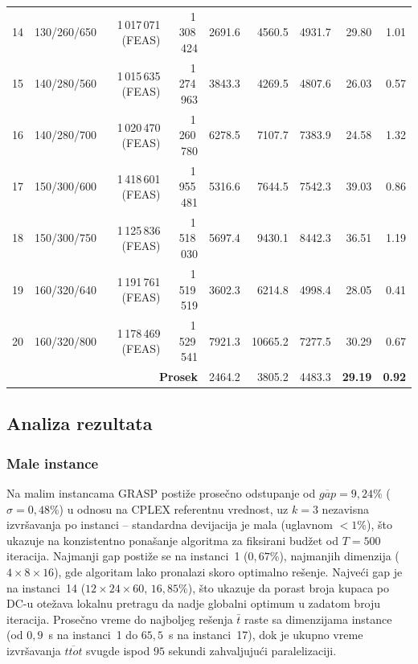 \documentclass[12pt,a4paper]{article}
\begin{document}
\begin{longtable}{r l r r r r r r r}
14 & 130/260/650 & 1\,017\,071 (FEAS) & 1\,308\,424 & 2691.6 & 4560.5 & 4931.7 & 29.80 & 1.01 \\
15 & 140/280/560 & 1\,015\,635 (FEAS) & 1\,274\,963 & 3843.3 & 4269.5 & 4807.6 & 26.03 & 0.57 \\
16 & 140/280/700 & 1\,020\,470 (FEAS) & 1\,260\,780 & 6278.5 & 7107.7 & 7383.9 & 24.58 & 1.32 \\
17 & 150/300/600 & 1\,418\,601 (FEAS) & 1\,955\,481 & 5316.6 & 7644.5 & 7542.3 & 39.03 & 0.86 \\
18 & 150/300/750 & 1\,125\,836 (FEAS) & 1\,518\,030 & 5697.4 & 9430.1 & 8442.3 & 36.51 & 1.19 \\
19 & 160/320/640 & 1\,191\,761 (FEAS) & 1\,519\,519 & 3602.3 & 6214.8 & 4998.4 & 28.05 & 0.41 \\
20 & 160/320/800 & 1\,178\,469 (FEAS) & 1\,529\,541 & 7921.3 & 10665.2 & 7277.5 & 30.29 & 0.67 \\
\midrule
\multicolumn{4}{r}{\textbf{Prosek}} & 2464.2 & 3805.2 & 4483.3 & \textbf{29.19} & \textbf{0.92} \\
\end{longtable}

\subsection{Analiza rezultata}

\subsubsection{Male instance}

Na malim instancama GRASP postiže prosečno odstupanje od $\overline{gap} =
9{,}24\%$ ($\sigma = 0{,}48\%$) u odnosu na CPLEX referentnu vrednost, uz
$k=3$ nezavisna izvršavanja po instanci -- standardna devijacija je mala
(uglavnom $< 1\%$), što ukazuje na konzistentno ponašanje algoritma za
fiksirani budžet od $T=500$ iteracija.
Najmanji gap postiže se na instanci~1 ($0{,}67\%$), najmanjih dimenzija
($4\times 8\times 16$), gde algoritam lako pronalazi skoro optimalno
rešenje. Najveći gap je na instanci~14 ($12 \times 24 \times 60$,
$16{,}85\%$), što ukazuje da porast broja kupaca po DC-u otežava lokalnu
pretragu da nadje globalni optimum u zadatom broju iteracija.
Prosečno vreme do najboljeg rešenja $\bar t$ raste sa dimenzijama instance
(od $0{,}9$~s na instanci~1 do $65{,}5$~s na instanci~17), dok je ukupno
vreme izvršavanja $\overline{ttot}$ svugde ispod $95$ sekundi zahvaljujući
paralelizaciji.
\end{document}
